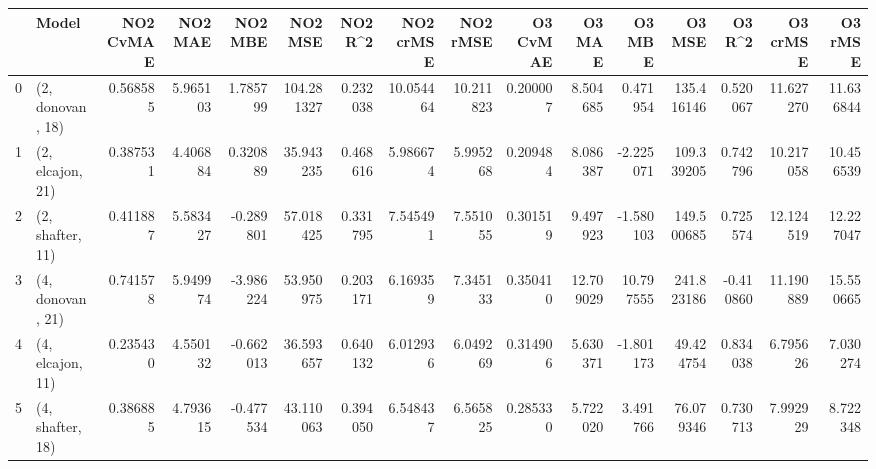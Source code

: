 \begin{tabular}{llrrrrrrrrrrrrrr}
\toprule
{} &             Model &  NO2 CvMAE &   NO2 MAE &   NO2 MBE &     NO2 MSE &   NO2 R\textasciicircum2 &  NO2 crMSE &   NO2 rMSE &  O3 CvMAE &     O3 MAE &     O3 MBE &      O3 MSE &    O3 R\textasciicircum2 &   O3 crMSE &    O3 rMSE \\
\midrule
0 &  (2, donovan, 18) &   0.568585 &  5.965103 &  1.785799 &  104.281327 &  0.232038 &  10.054464 &  10.211823 &  0.200007 &   8.504685 &   0.471954 &  135.416146 &  0.520067 &  11.627270 &  11.636844 \\
1 &  (2, elcajon, 21) &   0.387531 &  4.406884 &  0.320889 &   35.943235 &  0.468616 &   5.986674 &   5.995268 &  0.209484 &   8.086387 &  -2.225071 &  109.339205 &  0.742796 &  10.217058 &  10.456539 \\
2 &  (2, shafter, 11) &   0.411887 &  5.583427 & -0.289801 &   57.018425 &  0.331795 &   7.545491 &   7.551055 &  0.301519 &   9.497923 &  -1.580103 &  149.500685 &  0.725574 &  12.124519 &  12.227047 \\
3 &  (4, donovan, 21) &   0.741578 &  5.949974 & -3.986224 &   53.950975 &  0.203171 &   6.169359 &   7.345133 &  0.350410 &  12.709029 &  10.797555 &  241.823186 & -0.410860 &  11.190889 &  15.550665 \\
4 &  (4, elcajon, 11) &   0.235430 &  4.550132 & -0.662013 &   36.593657 &  0.640132 &   6.012936 &   6.049269 &  0.314906 &   5.630371 &  -1.801173 &   49.424754 &  0.834038 &   6.795626 &   7.030274 \\
5 &  (4, shafter, 18) &   0.386885 &  4.793615 & -0.477534 &   43.110063 &  0.394050 &   6.548437 &   6.565825 &  0.285330 &   5.722020 &   3.491766 &   76.079346 &  0.730713 &   7.992929 &   8.722348 \\
\bottomrule
\end{tabular}
